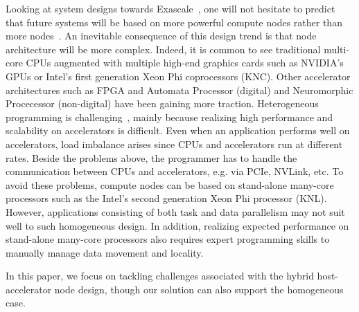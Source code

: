 Looking at system designs towards Exascale~\cite{top500}, one will not hesitate to predict that future systems will be based on more powerful compute nodes rather than more nodes~\cite{Shalf:exascaleChallenges}.  
An inevitable consequence of this design trend is that node architecture will be more complex.
Indeed, it is common to see traditional multi-core CPUs augmented with multiple high-end graphics cards such as NVIDIA's GPUs or Intel's first generation Xeon Phi coprocessors (KNC).
Other accelerator architectures such as FPGA and Automata Processor (digital) and Neuromorphic Procecessor (non-digital) have been gaining more traction.
Heterogeneous programming is challenging~\cite{exascaleRoadMap}, mainly because realizing high performance and scalability on accelerators is difficult.
Even when an application performs well on accelerators, load imbalance arises since CPUs and accelerators run at different rates.
Beside the problems above, the programmer has to handle the communication between CPUs and accelerators, e.g. via PCIe, NVLink, etc.
To avoid these problems, compute nodes can be based on stand-alone many-core processors such as the Intel's second generation Xeon Phi processor (KNL).
However, applications consisting of both task and data parallelism may not suit well to such homogeneous design.
In addition, realizing expected performance on stand-alone many-core processors also requires expert programming skills
to manually manage data movement and locality.





In this paper, we focus on tackling challenges associated with the hybrid host-accelerator node design, though our solution can also support the homogeneous case.
